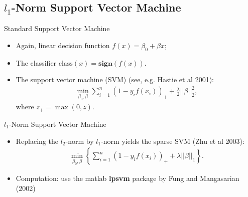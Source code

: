 \documentclass[12pt]{beamer}
\newcommand{\1}[1]{{\mathbf 1}\left\{#1\right\}}        %
\begin{document}
\subsection{$l_1$-Norm Support Vector Machine}
\begin{frame}[fragile]{Standard Support Vector Machine}

\begin{itemize}[<+->]
\item Again, linear decision function $f(x) = \beta_0 + \beta x$;
\item The classifier $\text{class}(x) = \textbf{sign} (f(x))$. 
\item  The support vector machine (SVM) (see, e.g. Hastie et al 2001): 
\begin{align*}
\min_{\beta_0,\beta} \sum_{i=1}^n(1-y_if(x_i))_+ + \frac{\lambda}{2} ||\beta||_2^2,
\end{align*}
where $z_+ = \max(0,z)$. 
\end{itemize}

\end{frame}


\begin{frame}[fragile]{$l_1$-Norm Support Vector Machine}

\begin{itemize}[<+->]  
\item Replacing the $l_2$-norm by $l_1$-norm yields the sparse SVM (Zhu et al 2003):
\begin{align*}
\min_{\beta_0,\beta} \left\{ \sum_{i=1}^n(1-y_if(x_i))_+ + \lambda ||\beta||_1\right\}. 
\end{align*}
\item Computation: use the matlab \textbf{lpsvm} package by Fung and Mangasarian (2002)
\end{itemize}

\end{frame}
\end{document}
